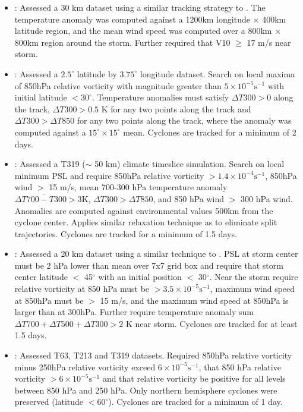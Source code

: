 \documentclass[gmdd, hvmath]{copernicus}
\begin{document}
\begin{itemize}
\item \cite{walsh2004fine}:  Assessed a 30 km dataset using a similar tracking strategy to \cite{nguyen2001interannual}.  The temperature anomaly was computed against a 1200km longitude $\times$ 400km latitude region, and the mean wind speed was computed over a 800km $\times$ 800km region around the storm.  Further required that V10 $\geq$ 17 m/s near storm.

\item \cite{mcdonald2005tropical}:  Assessed a $2.5^\circ$ latitude by $3.75^\circ$ longitude dataset.  Search on local maxima of 850hPa relative vorticity with magnitude greater than $5 \times 10^{-5} \mbox{s}^{-1}$ with initial latitude $< 30^\circ$.  Temperature anomalies must satisfy $\Delta T300 > 0$ along the track, $\Delta T300 > 0.5$ K for any two points along the track and $\Delta T300 > \Delta T850$ for any two points along the track, where the anomaly was computed against a $15^\circ \times 15^\circ$ mean.  Cyclones are tracked for a minimum of 2 days.

\item \cite{chauvin2006vortices}:  Assessed a T319 ($\sim$ 50 km) climate timeslice simulation. Search on local minimum PSL and require 850hPa relative vorticity $> 1.4 \times 10^{-4} \mbox{s}^{-1}$, 850hPa wind $>$ 15 m/s, mean 700-300 hPa temperature anomaly $\Delta \overline{T700-T300} > 3 \mbox{K}$, $\Delta T300 > \Delta T850$, and 850 hPa wind $>$ 300 hPa wind. Anomalies are computed against environmental values 500km from the cyclone center. Applies similar relaxation technique as \citet{camargo2002improving} to eliminate split trajectories. Cyclones are tracked for a minimum of 1.5 days.

\item \cite{oouchi2006tropical}:  Assessed a 20 km dataset using a similar technique to \cite{sugi2002influence}.  PSL at storm center must be 2 hPa lower than mean over 7x7 grid box and require that storm center latitude $<$ 45$^\circ$ with an initial position $<$ 30$^\circ$.  Near the storm require relative vorticity at 850 hPa must be $> 3.5 \times 10^{-5} \mbox{s}^{-1}$, maximum wind speed at 850hPa must be $>$ 15 m/s, and the maximum wind speed at 850hPa is larger than at 300hPa.  Further require temperature anomaly sum $\Delta T700+ \Delta T500+ \Delta T300 > 2$ K near storm.  Cyclones are tracked for at least 1.5 days.

\item \cite{bengtsson2007how}:  Assessed T63, T213 and T319 datasets.  Required 850hPa relative vorticity minus 250hPa relative vorticity exceed $6 \times 10^{-5} \mbox{s}^{-1}$, that 850 hPa relative vorticity $> 6 \times 10^{-5} \mbox{s}^{-1}$ and that relative vorticity be positive for all levels between 850 hPa and 250 hPa.  Only northern hemisphere cyclones were preserved (latitude $< 60^\circ$).  Cyclones are tracked for a minimum of 1 day.


\end{itemize}
\end{document}
